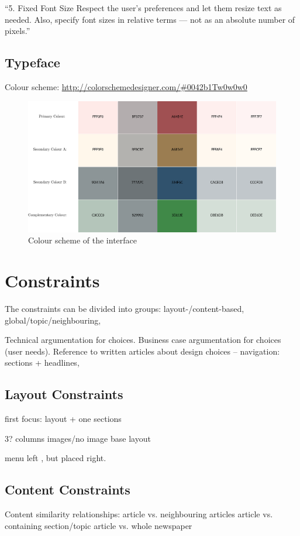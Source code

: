 ``5. Fixed Font Size
Respect the user's preferences and let them resize text as needed. Also, specify font sizes in relative terms — not as an absolute number of pixels.''
\cite{NielsenOnlineReading}

\subsection{Typeface}

Colour scheme: \url{http://colorschemedesigner.com/#0042b1Tw0w0w0}

\begin{figure}[h!tp]
	\centering
		\includegraphics[width=.45\textwidth]{img/colour-scheme.eps}
	\caption{Colour scheme of the interface \protect\cite{colorschemedesigner.com}}
	\label{fig:colour-scheme}
\end{figure}

\section{Constraints}
The constraints can be divided into groups: layout-/content-based, global/topic/neighbouring, 


Technical argumentation for choices.
Business case argumentation for choices (user needs).
Reference to written articles about design choices -- navigation: sections + headlines, 

\subsection{Layout Constraints}
first focus: layout + one sections

3? columns
images/no image
base layout


menu left \cite{kristin_fredrik.pdf}, but placed right.

\subsection{Content Constraints}
Content similarity relationships:
article vs. neighbouring articles
article vs. containing section/topic
article vs. whole newspaper

